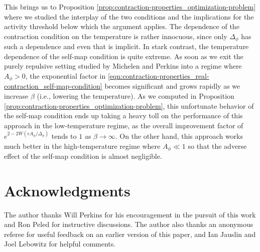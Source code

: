 \documentclass[11pt]{article}
\newcommand{\pwcc}{\Delta_{\phi}}
\newcommand{\aconst}{A_{\phi}}
\numberwithin{equation}{section}
\theoremstyle{plain}
\theoremstyle{definition}
\theoremstyle{remark}
\begin{document}
This brings us to Proposition \ref{prop:contraction-properties_optimization-problem} where we studied the interplay of the two conditions and the implications for the activity threshold below which the argument applies.
The dependence of the contraction condition on the temperature is rather innocuous, since only $\pwcc$ has such a dependence and even that is implicit.
In stark contrast, the temperature dependence of the self-map condition is quite extreme.
As soon as we exit the purely repulsive setting studied by Michelen and Perkins into a regime where $\aconst>0$, the exponential factor in \eqref{eqn:contraction-properties_real-contraction_self-map-condition} becomes significant and grows rapidly as we increase $\beta$ (i.e., lowering the temperature).
As we computed in Proposition \ref{prop:contraction-properties_optimization-problem}, this unfortunate behavior of the self-map condition ends up taking a heavy toll on the performance of this approach in the low-temperature regime, as the overall improvement factor of $e^{2-2W(e\aconst/\pwcc)}$ tends to $1$ as $\beta\rightarrow\infty$.
On the other hand, this approach works much better in the high-temperature regime where $\aconst\ll 1$ so that the adverse effect of the self-map condition is almost negligible.



\section*{Acknowledgments}

The author thanks Will Perkins for his encouragement in the pursuit of this work and Ron Peled for instructive discussions.
The author also thanks an anonymous referee for useful feedback on an earlier version of this paper, and Ian Jauslin and Joel Lebowitz for helpful comments.





\end{document}
